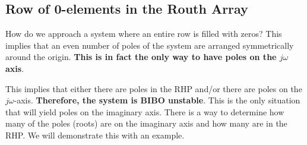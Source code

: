\documentclass{book}
\newcommand{\jw}{j\omega}
\begin{document}
\subsection*{Row of 0-elements in the Routh Array}
How do we approach a system where an entire row is filled with zeros? This implies that an even number of poles of the system are arranged symmetrically around the origin. \textbf{This is in fact the only way to have poles on the $ \jw $ axis}.
\begin{center}
\end{center}
This implies that either there are poles in the RHP and/or there are poles on the $ j\omega $-axis. \textbf{Therefore, the system is BIBO unstable}. This is the only situation that will yield poles on the imaginary axis. There is a way to determine how many of the poles (roots) are on the imaginary axis and how many are in the RHP. We will demonstrate this with an example.
\end{document}
